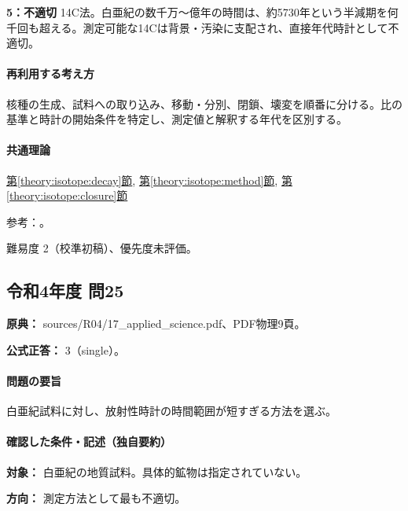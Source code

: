 \noindent\textbf{5：不適切} 14C法。白亜紀の数千万〜億年の時間は、約5730年という半減期を何千回も超える。測定可能な14Cは背景・汚染に支配され、直接年代時計として不適切。\par

\paragraph{再利用する考え方} 核種の生成、試料への取り込み、移動・分別、閉鎖、壊変を順番に分ける。比の基準と時計の開始条件を特定し、測定値と解釈する年代を区別する。

\paragraph{共通理論} \hyperref[theory:isotope:decay]{第\ref*{theory:isotope:decay}節}, \hyperref[theory:isotope:method]{第\ref*{theory:isotope:method}節}, \hyperref[theory:isotope:closure]{第\ref*{theory:isotope:closure}節}

\par 参考：\cite{iso_radiometric,iso_zircon}。

\par 難易度 2（校準初稿）、優先度未評価。

\subsection{令和4年度 問25}
\label{q:r04-reg-applied-25}

\noindent\textbf{原典：} sources/R04/17\_applied\_science.pdf、PDF物理9頁。

\textbf{公式正答：} 3（single）。

\paragraph{問題の要旨} 白亜紀試料に対し、放射性時計の時間範囲が短すぎる方法を選ぶ。

\paragraph{確認した条件・記述（独自要約）}\mbox{}\par

\noindent\textbf{対象：} 白亜紀の地質試料。具体的鉱物は指定されていない。\par

\noindent\textbf{方向：} 測定方法として最も不適切。\par

